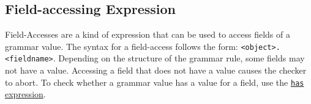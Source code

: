 
\subsection{Field-accessing Expression}
{
	Field-Accesses are a kind of expression that can be used to access fields
	of a grammar value.
	The syntax for a field-access follows the
	form: \texttt{<object>.<fieldname>}.
	Depending on the structure of the grammar rule,
	some fields may not have a value. Accessing a field that does not
	have a value causes the checker to abort. To check whether a grammar value
	has a value for a field, use the
	\hyperref[subsec:possession]{\texttt{has} expression}.
}
